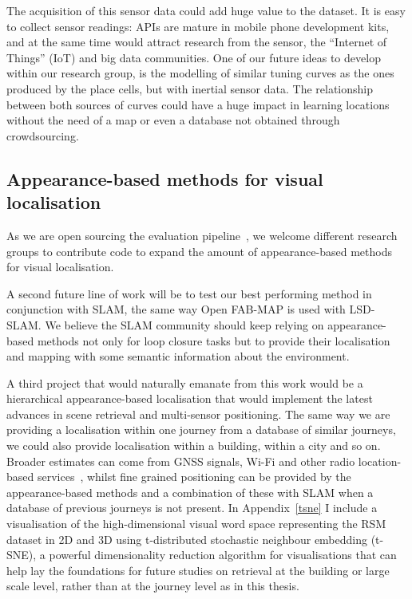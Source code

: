 The acquisition of this sensor data could add huge value to the dataset. It is easy to collect sensor readings: APIs are mature in mobile phone development kits, and at the same time would attract research from the sensor, the ``Internet of Things'' (IoT) and big data communities. One of our future ideas to develop within our research group, is the modelling of similar tuning curves as the ones produced by the place cells, but with inertial sensor data. The relationship between both sources of curves could have a huge impact in learning locations without the need of a map or even a database not obtained through crowdsourcing.

\subsection{Appearance-based methods for visual localisation}
As we are open sourcing the evaluation pipeline~\cite{jose_rivera_rubio_2015_33762}, we welcome different research groups to contribute code to expand the amount of appearance-based methods for visual localisation.

A second future line of work will be to test our best performing method in conjunction with SLAM, the same way Open FAB-MAP is used with LSD-SLAM. We believe the SLAM community should keep relying on appearance-based methods not only for loop closure tasks but to provide their localisation and mapping with some semantic information about the environment.

A third project that would naturally emanate from this work would be a hierarchical appearance-based localisation that would implement the latest advances in scene retrieval and multi-sensor positioning. The same way we are providing a localisation within one journey from a database of similar journeys, we could also provide localisation within a building, within a city and so on. Broader estimates can come from GNSS signals, Wi-Fi and other radio location-based services~\cite{wang2012no}, whilst fine grained positioning can be provided by the appearance-based methods and a combination of these with SLAM when a database of previous journeys is not present. In Appendix~\ref{tsne} I include a visualisation of the high-dimensional visual word space representing the RSM dataset in 2D and 3D using t-distributed stochastic neighbour embedding (t-SNE), a powerful dimensionality reduction algorithm for visualisations that can help lay the foundations for future studies on retrieval at the building or large scale level, rather than at the journey level as in this thesis.


